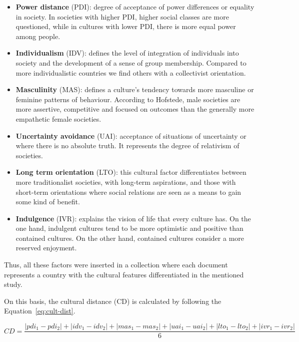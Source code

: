 \begin{itemize}
	\begin{itemize}
	\item \textbf{Power distance} (PDI): degree of acceptance of power differences or equality in society. In societies with higher PDI, higher social classes are more questioned, while in cultures with lower PDI, there is more equal power among people.
	\item \textbf{Individualism} (IDV): defines the level of integration of individuals into society and the development of a sense of group membership. Compared to more individualistic countries we find others with a collectivist orientation.
	\item \textbf{Masculinity} (MAS): defines a culture's tendency towards more masculine or feminine patterns of behaviour. According to Hofstede, male societies are more assertive, competitive and focused on outcomes than the generally more empathetic female societies.
	\item \textbf{Uncertainty avoidance} (UAI): acceptance of situations of uncertainty or where there is no absolute truth. It represents the degree of relativism of societies.
	\item \textbf{Long term orientation} (LTO): this cultural factor differentiates between more traditionalist societies, with long-term aspirations, and those with short-term orientations where social relations are seen as a means to gain some kind of benefit.
	\item \textbf{Indulgence} (IVR): explains the vision of life that every culture has. On the one hand, indulgent cultures tend to be more optimistic and positive than contained cultures. On the other hand, contained cultures consider a more reserved enjoyment.\newline
	\end{itemize}

	Thus, all these factors were inserted in a collection where each document represents a country with the cultural features differentiated in the mentioned study.\newline
	
	On this basis, the cultural distance (CD) is calculated by following the Equation~\ref{eq:cult-dist}.
	
	\begin{equation}
		\label{eq:cult-dist}
		CD = \frac{\left| pdi_1 - pdi_2 \right| + \left| idv_1 - idv_2 \right| + \left| mas_1 - mas_2 \right| + \left| uai_1 - uai_2 \right| + \left| lto_1 - lto_2 \right| + \left| ivr_1 - ivr_2 \right|}{6}
	\end{equation}
	

\end{itemize}
